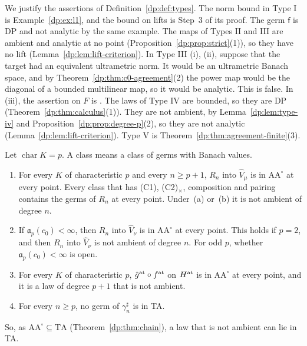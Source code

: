 We justify the assertions of Definition~\ref{dp:def:types}. The norm bound in Type I is Example~\ref{dp:ex:l1}, and the bound on lifts is Step~3 of its proof. The germ $\mathsf f$ is DP and not analytic by the same example. The maps of Types II and III are ambient and analytic at no point (Proposition~\ref{dp:prop:strict}(1)), so they have no lift (Lemma~\ref{dp:lem:lift-criterion}). In Type III (i), (ii), suppose that the target had an equivalent ultrametric norm. It would be an ultrametric Banach space, and by Theorem~\ref{dp:thm:c0-agreement}(2) the power map would be the diagonal of a bounded multilinear map, so it would be analytic. This is false. In (iii), the assertion on $F$ is \cite[Theorem~7.2(1)]{I}. The laws of Type IV are bounded, so they are DP (Theorem~\ref{dp:thm:calculus}(1)). They are not ambient, by Lemma~\ref{dp:lem:type-iv} and Proposition~\ref{dp:prop:degree-p}(2), so they are not analytic (Lemma~\ref{dp:lem:lift-criterion}). Type V is Theorem~\ref{dp:thm:agreement-finite}(3).

\begin{lemma}[Type IV]\label{dp:lem:type-iv}
Let $\operatorname{char}K=p$. A class means a class of germs with Banach values.
\begin{enumerate}
\item For every $K$ of characteristic $p$ and every $n\ge p+1$, $R_n$ into $\widehat V_\mu$ is in $\mathrm{AA}^\circ$ at every point. Every class that has \textup{(C1)}, \textup{(C2)}$_\times$, composition and pairing contains the germs of $R_n$ at every point. Under~\textup{(a)} or~\textup{(b)} it is not ambient of degree $n$.
\item If $\mathfrak a_p(c_0)<\infty$, then $R_n$ into $\widehat V_\nu$ is in $\mathrm{AA}^\circ$ at every point. This holds if $p=2$, and then $R_n$ into $\widehat V_\nu$ is not ambient of degree $n$. For odd $p$, whether $\mathfrak a_p(c_0)<\infty$ is open.
\item For every $K$ of characteristic $p$, $\hat g^{\rm at}\circ f^{\rm at}$ on $H^{\rm at}$ is in $\mathrm{AA}^\circ$ at every point, and it is a law of degree $p+1$ that is not ambient.
\item For every $n\ge p$, no germ of $\gamma^\sharp_n$ is in TA.
\end{enumerate}
So, as $\mathrm{AA}^\circ\subseteq\mathrm{TA}$ (Theorem~\ref{dp:thm:chain}), a law that is not ambient can lie in TA.
\end{lemma}

